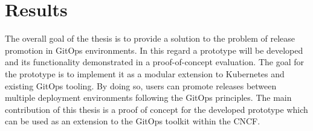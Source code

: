 \chapter{Results}

The overall goal of the thesis is to
provide a solution to the problem of release promotion in GitOps environments.
In this regard a prototype will be developed
and its functionality demonstrated in a proof-of-concept evaluation.
The goal for the prototype is to implement it as a modular extension to Kubernetes
and existing GitOps tooling.
By doing so, users can promote releases between multiple deployment environments
following the GitOps principles.
The main contribution of this thesis is a proof of concept for the developed prototype
which can be used as an extension to the GitOps toolkit within the CNCF.











%
%
%
%

